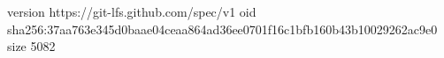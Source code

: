version https://git-lfs.github.com/spec/v1
oid sha256:37aa763e345d0baae04ceaa864ad36ee0701f16c1bfb160b43b10029262ac9e0
size 5082
